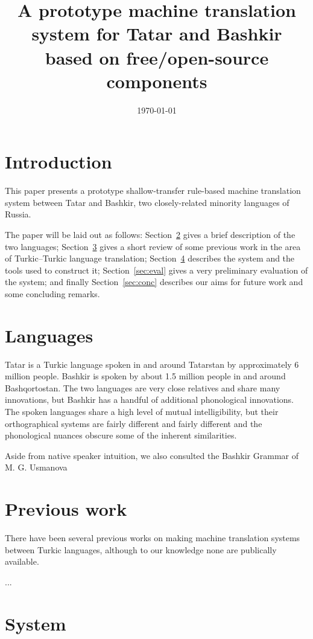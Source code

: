 \documentclass[11pt,a4paper]{article}
\title{A prototype machine translation system for Tatar and Bashkir based on 
   free/open-source components}
\date{\today}
\begin{document}
\maketitleabstract

\section{Introduction}

This paper presents a prototype shallow-transfer rule-based machine translation
system between Tatar and Bashkir, two closely-related minority languages of Russia.

The paper will be laid out as follows: Section~\ref{sec:lang} gives a brief description
of the two languages; Section~\ref{sec:prev} gives a short review of some previous
work in the area of Turkic--Turkic language translation; Section~\ref{sec:sys} 
describes the system and the tools used to construct it; Section~\ref{sec:eval}
gives a very preliminary evaluation of the system; and finally Section~\ref{sec:conc}
describes our aims for future work and some concluding remarks.

\section{Languages}
\label{sec:lang}

Tatar is a Turkic language spoken in and around Tatarstan by approximately 6 million people.  
Bashkir is spoken by about 1.5 million people in and around Bashqortostan.  The two languages 
are very close relatives and share many innovations, but Bashkir has a handful of additional 
phonological innovations.  The spoken languages share a high level of mutual intelligibility, 
but their orthographical systems are fairly different and fairly different and the phonological 
nuances obscure some of the inherent similarities.

Aside from native speaker intuition, we also consulted the Bashkir Grammar of M. G. Usmanova \cite{usmanova06}

\section{Previous work}
\label{sec:prev}

There have been several previous works on making machine translation systems between 
Turkic languages, although to our knowledge none are publically available. 

...


\section{System}
\label{sec:sys}
\end{document}
